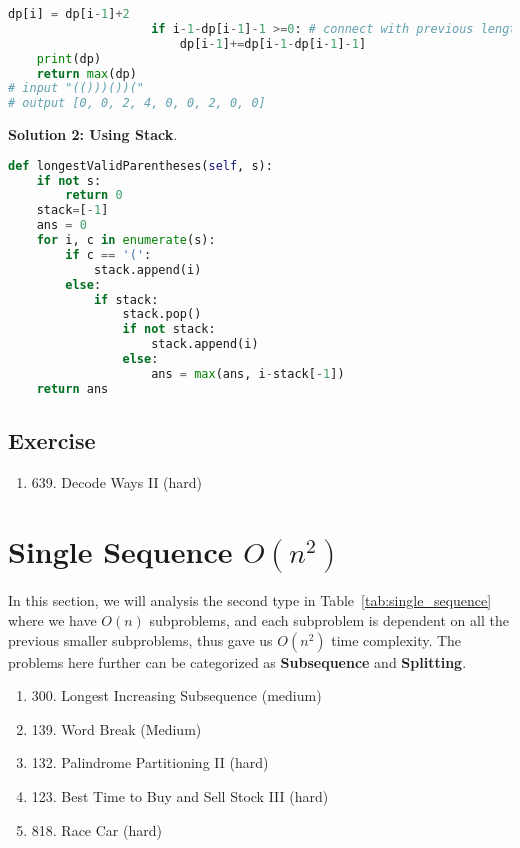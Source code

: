 \documentclass[../main.tex]{subfiles}
\begin{document}
\begin{examples}[resume]
\begin{lstlisting}[language=Python]
                    dp[i] = dp[i-1]+2
                    if i-1-dp[i-1]-1 >=0: # connect with previous length
                        dp[i-1]+=dp[i-1-dp[i-1]-1]
    print(dp)
    return max(dp)
# input "(()))())("
# output [0, 0, 2, 4, 0, 0, 2, 0, 0]
\end{lstlisting}
\textbf{Solution 2: Using Stack}.
\begin{lstlisting}[language=Python]
def longestValidParentheses(self, s):
    if not s:
        return 0
    stack=[-1]
    ans = 0
    for i, c in enumerate(s):
        if c == '(':
            stack.append(i)
        else:
            if stack:
                stack.pop()
                if not stack:
                    stack.append(i)
                else:
                    ans = max(ans, i-stack[-1])
    return ans
\end{lstlisting}

\end{examples}

\subsection{Exercise}
\begin{enumerate}
    \item 639. Decode Ways II (hard)
\end{enumerate}

\section{Single Sequence $O(n^2)$}
\label{sec_single_n2}
In this section, we will analysis the second type in Table~\ref{tab:single_sequence} where we have $O(n)$ subproblems, and each subproblem is dependent on all the previous smaller subproblems, thus gave us $O(n^2)$ time complexity. The problems here further can be categorized as \textbf{Subsequence} and \textbf{Splitting}.
\begin{enumerate}
    \item 300. Longest Increasing Subsequence (medium)
    \item 139. Word Break (Medium)
    \item 132. Palindrome Partitioning II (hard)
    \item 123. Best Time to Buy and Sell Stock III (hard)
    \item 818. Race Car (hard)
\end{enumerate}
\end{document}
